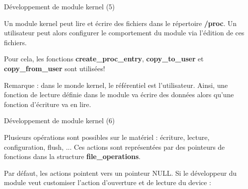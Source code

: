 \documentclass[12pt, t]{beamer}
\begin{document}
\begin{frame}{Développement de module kernel (5)}

    \vspace{20pt}
    Un module kernel peut lire et écrire des fichiers dans le répertoire
    {\textbf{/proc}}. Un utilisateur peut alors configurer le comportement
    du module via l'édition de ces fichiers.

    \vspace{20pt}
    Pour cela, les fonctions {\textbf{create\_proc\_entry}}, {\textbf{copy\_to\_user}}
    et {\textbf{copy\_from\_user}} sont utilisées!

    {
        \vspace{20pt}
        Remarque : dans le monde kernel, le référentiel est l'utilisateur. Ainsi,
        une fonction de lecture définie dans le module va écrire des données alors
        qu'une fonction d'écriture va en lire.
    }

\end{frame}


\begin{frame}{Développement de module kernel (6)}

    \vspace{15pt}
    Plusieurs opérations sont possibles sur le matériel : écriture, lecture,
    configuration, flush, ... Ces actions sont représentées par des pointeurs
    de fonctions dans la structure {\textbf{file\_operations}}.

    {
        \vspace{15pt}
        Par défaut, les actions pointent vers un pointeur NULL. Si le développeur
        du module veut customiser l'action d'ouverture et de lecture du device :
        \vspace{8pt}
        \lstfops
    }

\end{frame}
\end{document}
